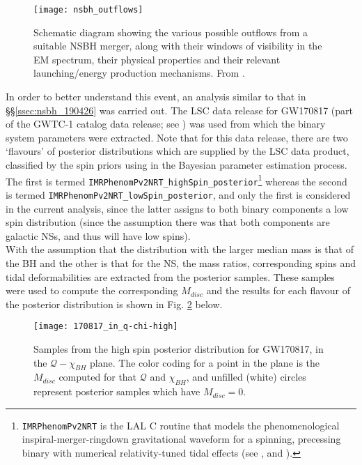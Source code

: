         \begin{figure}[H]
            \centering
            \texttt{[image: nsbh\_outflows]}
            \caption[EM outflows from NSBH mergers, from \cite{barbieri_2019a}]
            {
                Schematic diagram showing the various possible outflows from a suitable
                NSBH merger, along with their windows of visibility in the EM spectrum,
                their physical properties and their relevant launching/energy production
                mechanisms. From \cite{barbieri_2019a}.
            }
            \label{fig:nsbh_outflows}
        \end{figure}

        In order to better understand this event, an analysis similar to that in
        \S\S\ref{ssec:nsbh_190426} was carried out. The LSC data release for GW170817
        (part of the GWTC-1 catalog data release; see \cite{gwtc1_DR}) was used from
        which the binary system parameters were extracted. Note that for this data
        release, there are two `flavours' of posterior distributions which are supplied
        by the LSC data product, classified by the spin priors using in the Bayesian
        parameter estimation process.  The first is termed
        \texttt{IMRPhenomPv2NRT\_highSpin\_posterior}\footnote
        {
            \texttt{IMRPhenomPv2NRT} is the LAL C routine that models the
            phenomenological inspiral-merger-ringdown gravitational waveform for a
            spinning, precessing binary with numerical relativity-tuned tidal effects
            (see \cite{lalsuite}, and \cite{dietrich_2019}).
        }
        whereas the second is termed \texttt{IMRPhenomPv2NRT\_lowSpin\_posterior}, and
        only the first is considered in the current analysis, since the latter assigns
        to both binary components a low spin distribution (since the assumption there
        was that both components are galactic NSs, and thus will have low spins).\\
        With the assumption that the distribution with the larger median mass is that of
        the BH and the other is that for the NS, the mass ratios, corresponding spins
        and tidal deformabilities are extracted from the posterior samples. These
        samples were used to compute the corresponding $M_{disc}$ and the results for
        each flavour of the posterior distribution is shown in Fig.
        \ref{fig:170817_high} below.

        \begin{figure}[ht]
            \centering
            \texttt{[image: 170817\_in\_q-chi-high]}
            \caption[$M_{disc}$ for GW170817's High Spin Posterior Distribution]
            {
                Samples from the high spin posterior distribution for GW170817, in the
                $\mathcal{Q}-\chi_{BH}$ plane. The color coding for a point in the plane
                is the $M_{disc}$ computed for that $\mathcal{Q}$ and $\chi_{BH}$, and
                unfilled (white) circles represent posterior samples which have
                $M_{disc} = 0$.
            }
            \label{fig:170817_high}
        \end{figure}

